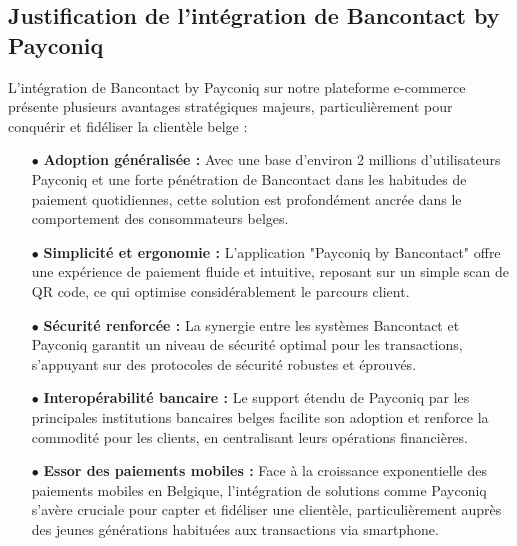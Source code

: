 \subsection{Justification de l'intégration de Bancontact by Payconiq}
L'intégration de Bancontact by Payconiq sur notre plateforme e-commerce présente plusieurs avantages stratégiques majeurs, particulièrement pour conquérir et fidéliser la clientèle belge :
\begin{itemize}
    \item [$\bullet$]\textbf{Adoption généralisée :} Avec une base d'environ 2 millions d'utilisateurs Payconiq et une forte pénétration de Bancontact dans les habitudes de paiement quotidiennes, cette solution est profondément ancrée dans le comportement des consommateurs belges.
    \item [$\bullet$]\textbf{Simplicité et ergonomie :} L'application "Payconiq by Bancontact" offre une expérience de paiement fluide et intuitive, reposant sur un simple scan de QR code, ce qui optimise considérablement le parcours client.
    \item [$\bullet$]\textbf{Sécurité renforcée :} La synergie entre les systèmes Bancontact et Payconiq garantit un niveau de sécurité optimal pour les transactions, s'appuyant sur des protocoles de sécurité robustes et éprouvés.
    \item [$\bullet$]\textbf{Interopérabilité bancaire :} Le support étendu de Payconiq par les principales institutions bancaires belges facilite son adoption et renforce la commodité pour les clients, en centralisant leurs opérations financières.
    \item [$\bullet$]\textbf{Essor des paiements mobiles :} Face à la croissance exponentielle des paiements mobiles en Belgique, l'intégration de solutions comme Payconiq s'avère cruciale pour capter et fidéliser une clientèle, particulièrement auprès des jeunes générations habituées aux transactions via smartphone.
\end{itemize}
